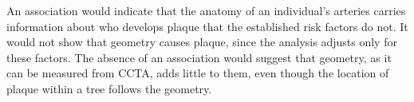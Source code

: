 An association would indicate that the anatomy of an individual's arteries carries information
about who develops plaque that the established risk factors do not.
It would not show that geometry causes plaque, since the analysis adjusts only for these
factors.
The absence of an association would suggest that geometry, as it can be measured from CCTA, adds
little to them, even though the location of plaque within a tree follows the geometry.
